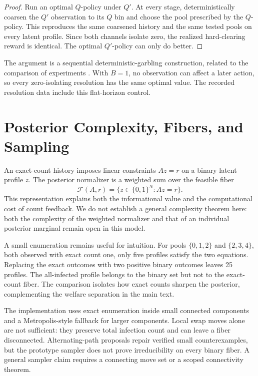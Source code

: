 \documentclass[11pt]{article}
\begin{document}
\begin{proof}
Run an optimal $Q$-policy under $Q'$. At every stage, deterministically coarsen
the $Q'$ observation to its $Q$ bin and choose the pool prescribed by the
$Q$-policy. This reproduces the same coarsened history and the same tested pools
on every latent profile. Since both channels isolate zero, the realized
hard-clearing reward is identical. The optimal $Q'$-policy can only do better.
\end{proof}

The argument is a sequential deterministic-garbling construction, related to
the comparison of experiments \cite{blackwell1951}. With $B=1$, no observation
can affect a later action, so every zero-isolating resolution has the same
optimal value. The recorded resolution data include this flat-horizon control.

\section{Posterior Complexity, Fibers, and Sampling}
\label{app:complexity}

An exact-count history imposes linear constraints $Az=r$ on a binary latent
profile $z$. The posterior normalizer is a weighted sum over the feasible fiber
\[
  \mathcal F(A,r)=\{z\in\{0,1\}^N:Az=r\}.
\]
This representation explains both the informational value and the computational
cost of count feedback. We do not establish a general complexity theorem here:
both the complexity of the weighted normalizer and that of an individual
posterior marginal remain open in this model.

A small enumeration remains useful for intuition. For pools
$\{0,1,2\}$ and $\{2,3,4\}$, both observed with exact count one, only five
profiles satisfy the two equations. Replacing the exact outcomes with two
positive binary outcomes leaves 25 profiles. The all-infected profile belongs
to the binary set but not to the exact-count fiber. The comparison isolates how
exact counts sharpen the posterior, complementing the welfare separation in the
main text.

The implementation uses exact enumeration inside small connected components and
a Metropolis-style fallback for larger components. Local swap moves alone are
not sufficient: they preserve total infection count and can leave a fiber
disconnected. Alternating-path proposals repair verified small counterexamples,
but the prototype sampler does not prove irreducibility on every binary fiber.
A general sampler claim requires a connecting move set or a scoped
connectivity theorem.
\end{document}
